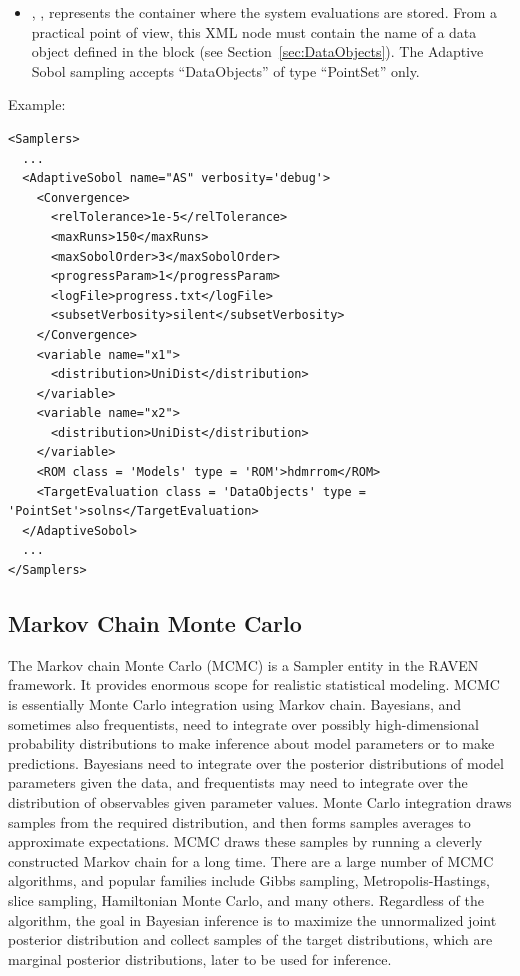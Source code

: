         \begin{itemize}
      \item {}, ,
        represents the container where the system evaluations are stored.
        From a practical point of view, this XML node must contain the name of
        a data object defined in the  block (see
        Section~\ref{sec:DataObjects}).
        The Adaptive Sobol sampling accepts ``DataObjects'' of type
        ``PointSet'' only.
\end{itemize}

Example:
\begin{lstlisting}[style=XML,morekeywords={class,limit,subGridTol,weight,persistence}]
<Samplers>
  ...
  <AdaptiveSobol name="AS" verbosity='debug'>
    <Convergence>
      <relTolerance>1e-5</relTolerance>
      <maxRuns>150</maxRuns>
      <maxSobolOrder>3</maxSobolOrder>
      <progressParam>1</progressParam>
      <logFile>progress.txt</logFile>
      <subsetVerbosity>silent</subsetVerbosity>
    </Convergence>
    <variable name="x1">
      <distribution>UniDist</distribution>
    </variable>
    <variable name="x2">
      <distribution>UniDist</distribution>
    </variable>
    <ROM class = 'Models' type = 'ROM'>hdmrrom</ROM>
    <TargetEvaluation class = 'DataObjects' type = 'PointSet'>solns</TargetEvaluation>
  </AdaptiveSobol>
  ...
</Samplers>
\end{lstlisting}

\subsection{Markov Chain Monte Carlo}
\label{subsec:MCMC}
The Markov chain Monte Carlo (MCMC) is a Sampler entity in the RAVEN framework.
It provides enormous scope for realistic statistical modeling. MCMC is essentially
Monte Carlo integration using Markov chain. Bayesians, and sometimes also frequentists,
need to integrate over possibly high-dimensional probability distributions to make inference
about model parameters or to make predictions. Bayesians need to integrate over the posterior
distributions of model parameters given the data, and frequentists may need to integrate
over the distribution of observables given parameter values. Monte Carlo integration draws
samples from the required distribution, and then forms samples averages to approximate expectations.
MCMC draws these samples by running a cleverly constructed Markov chain for a long time.
There are a large number of MCMC algorithms, and popular families include Gibbs sampling,
Metropolis-Hastings, slice sampling, Hamiltonian Monte Carlo, and many others. Regardless
of the algorithm, the goal in Bayesian inference is to maximize the unnormalized joint
posterior distribution and collect samples of the target distributions, which are marginal
posterior distributions, later to be used for inference.


